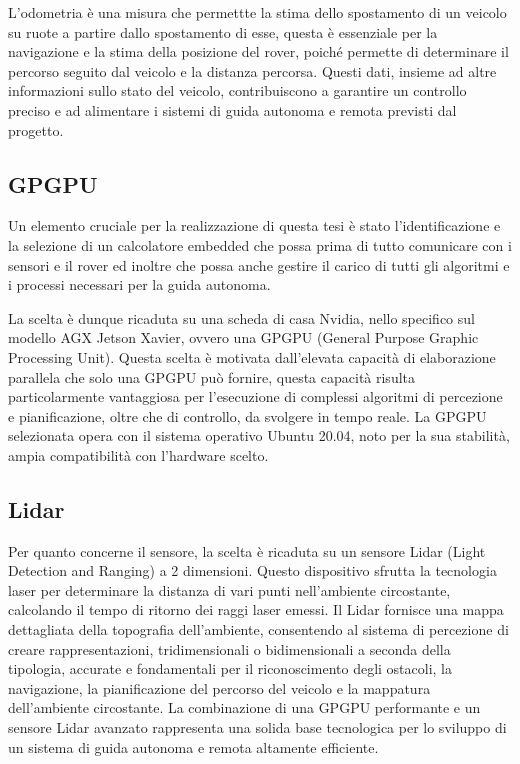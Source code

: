 \noindent L'odometria è una misura che permettte la stima dello spostamento di un veicolo su ruote a partire dallo spostamento di esse, questa è essenziale per la navigazione e la stima della posizione del rover, poiché permette di determinare il percorso seguito dal veicolo e la distanza percorsa. Questi dati, insieme ad altre informazioni sullo stato del veicolo, contribuiscono a garantire un controllo preciso e ad alimentare i sistemi di guida autonoma e remota previsti dal progetto.

\subsection{GPGPU}
Un elemento cruciale per la realizzazione di questa tesi è stato l'identificazione e la selezione di un calcolatore embedded che possa prima di tutto comunicare con i sensori e il rover ed inoltre che possa anche gestire il carico di tutti gli algoritmi e i processi necessari per la guida autonoma.

\noindent La scelta è dunque ricaduta su una scheda di casa Nvidia, nello specifico sul modello AGX Jetson Xavier, ovvero una GPGPU (General Purpose Graphic Processing Unit). Questa scelta è motivata dall'elevata capacità di elaborazione parallela che solo una GPGPU può fornire, questa capacità risulta particolarmente vantaggiosa per l'esecuzione di complessi algoritmi di percezione e pianificazione, oltre che di controllo, da svolgere in tempo reale. La GPGPU selezionata opera con il sistema operativo Ubuntu 20.04, noto per la sua stabilità, ampia compatibilità con l'hardware scelto.

\subsection{Lidar}
Per quanto concerne il sensore, la scelta è ricaduta su un sensore Lidar (Light Detection and Ranging) a 2 dimensioni. Questo dispositivo sfrutta la tecnologia laser per determinare la distanza di vari punti nell'ambiente circostante, calcolando il tempo di ritorno dei raggi laser emessi. Il Lidar fornisce una mappa dettagliata della topografia dell'ambiente, consentendo al sistema di percezione di creare rappresentazioni, tridimensionali o bidimensionali a seconda della tipologia, accurate e fondamentali per il riconoscimento degli ostacoli, la navigazione, la pianificazione del percorso del veicolo e la mappatura dell'ambiente circostante. La combinazione di una GPGPU performante e un sensore Lidar avanzato rappresenta una solida base tecnologica per lo sviluppo di un sistema di guida autonoma e remota altamente efficiente.

